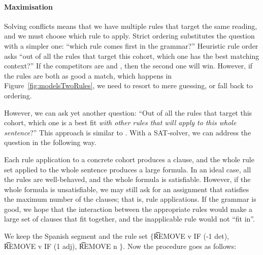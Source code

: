 \paragraph{Maximisation} 

Solving conflicts means that we have multiple rules that target the same reading, and we must choose which rule to apply.
Strict ordering substitutes the question with a simpler one: ``which rule comes first in the grammar?''
Heuristic rule order asks ``out of all the rules that target this cohort, which one has the best matching context?''
If the competitors are  and , then the second one will win. However, if the rules are both as good a match, which happens in Figure~\ref{fig:modelsTwoRules}, we need to resort to mere guessing, or fall back to ordering.

However, we can ask yet another question: ``Out of all the rules that target this cohort, which one is a best fit \emph{with other rules that will apply to this whole sentence}?''
This approach is similar to .
With a SAT-solver, we can address the question in the following way.


Each rule application to a concrete cohort produces a clause,
and the whole rule set applied to the whole sentence produces 
a large formula. In an ideal case, all the rules are well-behaved, 
and the whole formula is satisfiable. However, if the whole formula 
is unsatisfiable, we may still ask for an assignment that satisfies 
the maximum number of the clauses; that is, rule applications. 
If the grammar is good, we hope that the interaction between 
the appropriate rules would make a large set of clauses that 
fit together, and the inapplicable rule would not ``fit in''.


We keep the Spanish segment and the rule set $\{$\t{REMOVE v IF (-1 det)}, \t{REMOVE v IF (1 adj)}, \t{REMOVE n} $\}$.
Now the procedure goes as follows:

